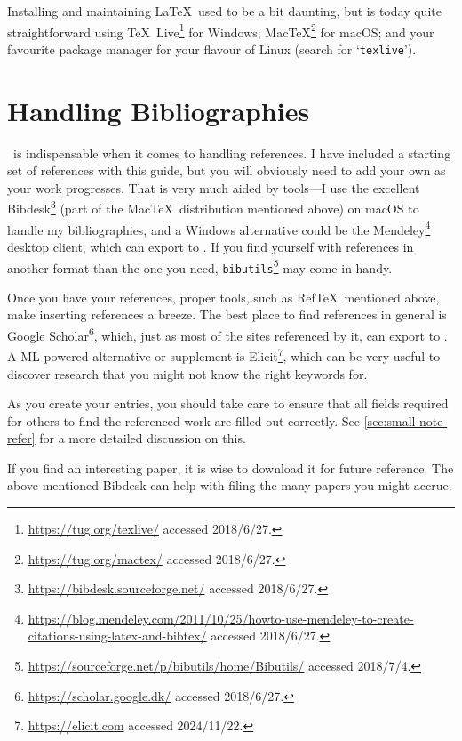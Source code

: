 Installing and maintaining \LaTeX\ used to be a bit daunting, but is today quite straightforward using \TeX\ Live\footnote{\url{https://tug.org/texlive/} accessed 2018/6/27.} for Windows; Mac\negthinspace\TeX\footnote{\url{https://tug.org/mactex/} accessed 2018/6/27.} for mac\-OS; and your favourite package manager for your flavour of Linux (search for `\texttt{texlive}').

\section*{Handling Bibliographies}
\label{sec:handl-bibl}

\mBibTeX\ is indispensable when it comes to handling references.
I have included a starting set of references with this guide, but you will obviously need to add your own as your work progresses.  That is very much aided by tools---I use the excellent Bibdesk\footnote{\url{https://bibdesk.sourceforge.net/} accessed   2018/6/27.} (part of the Mac\negthinspace\TeX\ distribution mentioned above) on macOS to handle my bibliographies, and a Windows alternative could be the Mendeley\footnote{\url{https://blog.mendeley.com/2011/10/25/howto-use-mendeley-to-create-citations-using-latex-and-bibtex/}   accessed 2018/6/27.}  desktop client, which can export to \mBibTeX.
If you find yourself with references in another format than the one you need, \texttt{bibutils}\footnote{\url{https://sourceforge.net/p/bibutils/home/Bibutils/}   accessed 2018/7/4.} may come in handy.

Once you have your references, proper tools, such as Ref\TeX\ mentioned above, make inserting references a breeze.
The best place to find references in general is Google Scholar\footnote{\url{https://scholar.google.dk/} accessed 2018/6/27.}, which, just as most of the sites referenced by it, can export to \mBibTeX.  A ML powered alternative or supplement is Elicit\footnote{\url{https://elicit.com} accessed 2024/11/22.}, which can be very useful to discover research that you might not know the right keywords for.

As you create your entries, you should take care to ensure that all fields required for others to find the referenced work are filled out correctly.
See \autoref{sec:small-note-refer} for a more detailed discussion on this.

If you find an interesting paper, it is wise to download it for future reference. The above mentioned Bibdesk can help with filing the many papers you might accrue. 

